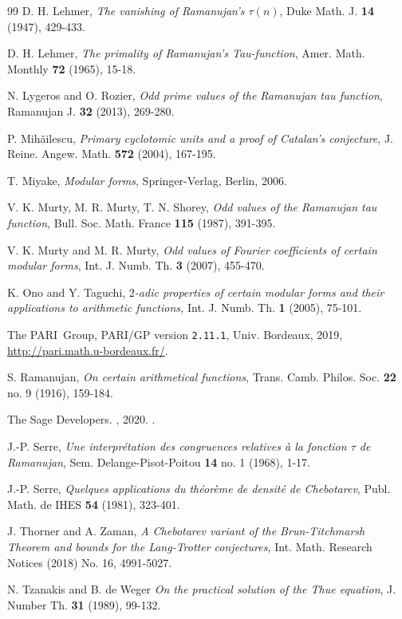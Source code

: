 \documentclass[12pt]{amsart}
\newcommand{\?}{\color{red}?}
\numberwithin{equation}{section}
\begin{document}
\begin{thebibliography}{99}
 D. H. Lehmer, \emph{The vanishing of Ramanujan's $\tau(n)$}, Duke Math. J.
\textbf{14} (1947), 429-433.

 D. H. Lehmer, \emph{The primality of Ramanujan's Tau-function},
Amer. Math. Monthly \textbf{72}  (1965), 15-18.

 N. Lygeros and O. Rozier, \emph{Odd prime values of the Ramanujan tau function},
Ramanujan J. \textbf{32} (2013), 269-280.

 P. Mih\u{a}ilescu, \emph{Primary cyclotomic units and a proof of Catalan's conjecture},
J. Reine. Angew. Math. \textbf{572} (2004), 167-195.

 T. Miyake, \emph{Modular forms}, Springer-Verlag, Berlin, 2006.


 V. K. Murty, M. R. Murty, T. N. Shorey, \emph{Odd values of the Ramanujan tau function},
Bull. Soc. Math. France \textbf{115} (1987), 391-395.

 V. K. Murty and M. R. Murty, \emph{Odd values of Fourier coefficients of certain modular forms},
Int. J. Numb. Th. \textbf{3} (2007), 455-470.

 K. Ono and Y. Taguchi, \emph{$2$-adic properties of certain modular forms
and their applications to arithmetic functions,} Int. J. Numb. Th. \textbf{1} (2005), 75-101.


    The PARI~Group, PARI/GP version \texttt{2.11.1}, Univ. Bordeaux, 2019,
    \url{http://pari.math.u-bordeaux.fr/}.

 S. Ramanujan, \emph{On certain arithmetical functions}, Trans. Camb. Philos. Soc.
\textbf{22} no. 9 (1916), 159-184.

 {The Sage Developers}. , 2020. .

 J.-P. Serre, \emph{Une interpr\'etation des congruences relatives \`a la fonction $\tau$ de Ramanujan},
Sem. Delange-Pisot-Poitou \textbf{14} no. 1 (1968), 1-17. 

 J.-P. Serre, \emph{Quelques applications du th\'eor\`eme de densit\'e de Chebotarev}, 
Publ. Math. de IHES \textbf{54} (1981), 323-401. 

 J. Thorner and A. Zaman, \emph{A Chebotarev variant of the Brun-Titchmarsh Theorem and bounds for the Lang-Trotter conjectures,}
Int. Math. Research Notices (2018) No. 16, 4991-5027.

 N. Tzanakis and B. de Weger \emph{On the practical solution of the Thue equation},
J. Number Th. \textbf{31} (1989), 99-132.


\end{thebibliography}
\end{document}
